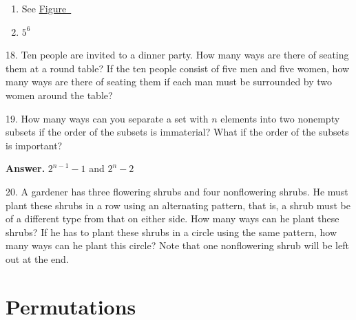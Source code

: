 \documentclass[10pt,]{book}
\theoremstyle{plain}
\theoremstyle{definition}
\theoremstyle{definition}
\theoremstyle{definition}
\begin{document}
\begin{exercisegroup}
\leavevmode%
\begin{enumerate}[label=\alph*]
\item\hypertarget{li-12}{}See \hyperref[fig-sol-2-1-17]{Figure~}%
\item\hypertarget{li-13}{}\(5^6\)%
\end{enumerate}
%
\item[18.]\hypertarget{exercise-18}{} Ten people are invited to a dinner party. How many ways are there of seating them at a round table? If the ten people consist of five men and five women, how many ways are there of seating them if each man must be surrounded by two women around the table?%
\par\smallskip
\item[19.]\hypertarget{exercise-19}{} How many ways can you separate a set with \(n\)  elements into two nonempty subsets if the order of the subsets is immaterial? What if the order of the subsets is important?%
\par\smallskip
\par\smallskip
\noindent\textbf{Answer.}\hypertarget{answer-10}{}\quad
\(2^{n-1}-1\) and \(2^n-2\)%
\item[20.]\hypertarget{exercise-20}{} A gardener has three flowering shrubs and four nonflowering shrubs. He must plant these shrubs in a row using an alternating pattern, that is, a shrub must be of a different type from that on either side. How many ways can he plant these shrubs? If he has to plant these shrubs in a circle using the same pattern, how many ways can he plant this circle? Note that one nonflowering shrub will be left out at the end.%
\par\smallskip
\end{exercisegroup}
\par\smallskip\noindent
\typeout{************************************************}
\typeout{************************************************}
\section[Permutations]{Permutations}\label{permutations}
\end{document}
